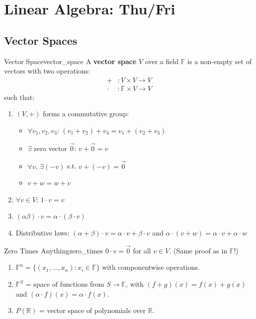 \documentclass[11pt, letterpaper, openany]{book}
\begin{document}
\section{Linear Algebra: Thu/Fri}

\subsection{Vector Spaces}

\begin{defn}{Vector Space}{vector_space}
A \textbf{vector space} $V$ over a field $\mathbb{F}$ is a non-empty set of vectors with two operations:
\begin{align*}
+&: V \times V \to V \\
\cdot&: \mathbb{F} \times V \to V
\end{align*}
such that:
\begin{enumerate}
    \item $(V, +)$ forms a commutative group:
    \begin{itemize}
        \item[(A1)] $\forall v_1, v_2, v_3$: $(v_1 + v_2) + v_3 = v_1 + (v_2 + v_3)$
        \item[(A2)] $\exists$ zero vector $\vec{0}$: $v + \vec{0} = v$
        \item[(A3)] $\forall v$, $\exists (-v)$ s.t. $v + (-v) = \vec{0}$
        \item[(A4)] $v + w = w + v$
    \end{itemize}
    \item $\forall v \in V$: $1 \cdot v = v$
    \item $(\alpha \beta) \cdot v = \alpha \cdot (\beta \cdot v)$
    \item Distributive laws: $(\alpha + \beta) \cdot v = \alpha \cdot v + \beta \cdot v$ and $\alpha \cdot (v + w) = \alpha \cdot v + \alpha \cdot w$
\end{enumerate}
\end{defn}

\begin{lem}{Zero Times Anything}{zero_times}
$0 \cdot v = \vec{0}$ for all $v \in V$. (Same proof as in $\mathbb{F}$!)
\end{lem}

\begin{example}
\begin{enumerate}
    \item $\mathbb{F}^n = \{(x_1, \ldots, x_n) : x_i \in \mathbb{F}\}$ with componentwise operations.
    \item $\mathbb{F}^S$ = space of functions from $S \to \mathbb{F}$, with $(f+g)(x) = f(x) + g(x)$ and $(\alpha \cdot f)(x) = \alpha \cdot f(x)$.
    \item $P(\mathbb{R})$ = vector space of polynomials over $\mathbb{R}$.
\end{enumerate}
\end{example}
\end{document}
